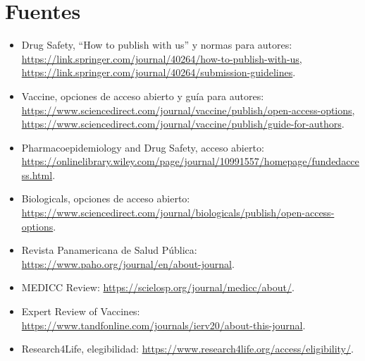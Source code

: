 \documentclass[11pt]{article}
\begin{document}
\section{Fuentes}
\begin{itemize}[leftmargin=*]\small
\item Drug Safety, ``How to publish with us'' y normas para autores:
  \url{https://link.springer.com/journal/40264/how-to-publish-with-us},
  \url{https://link.springer.com/journal/40264/submission-guidelines}.
\item Vaccine, opciones de acceso abierto y guía para autores:
  \url{https://www.sciencedirect.com/journal/vaccine/publish/open-access-options},
  \url{https://www.sciencedirect.com/journal/vaccine/publish/guide-for-authors}.
\item Pharmacoepidemiology and Drug Safety, acceso abierto:
  \url{https://onlinelibrary.wiley.com/page/journal/10991557/homepage/fundedaccess.html}.
\item Biologicals, opciones de acceso abierto:
  \url{https://www.sciencedirect.com/journal/biologicals/publish/open-access-options}.
\item Revista Panamericana de Salud Pública: \url{https://www.paho.org/journal/en/about-journal}.
\item MEDICC Review: \url{https://scielosp.org/journal/medicc/about/}.
\item Expert Review of Vaccines: \url{https://www.tandfonline.com/journals/ierv20/about-this-journal}.
\item Research4Life, elegibilidad: \url{https://www.research4life.org/access/eligibility/}.
\end{itemize}
\end{document}
